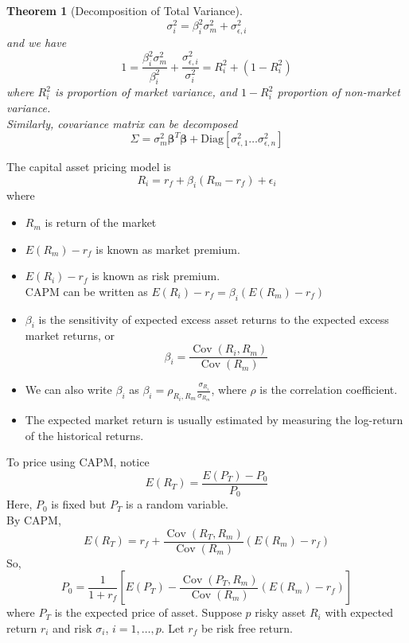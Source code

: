 \documentclass[11pt]{article}
\newtheorem{theorem}{Theorem}[section]
\theoremstyle{definition}
\DeclareMathOperator{\cov}{Cov}
\begin{document}
\begin{theorem}[Decomposition of Total Variance]
\[
\sigma_i^2 = \beta_i^2\sigma_m^2 + \sigma_{\epsilon, i}^2
\]
and we have
\[
1 = \frac{\beta_i^2\sigma_m^2}{\beta_i^2} + \frac{ \sigma_{\epsilon, i}^2}{\sigma_i^2} = R_i^2 + (1 - R_i^2)
\]
where $R_i^2$ is proportion of market variance, and $1-R_i^2$ proportion of non-market variance.\\
Similarly, covariance matrix can be decomposed
\[
\Sigma = \sigma_m^2\mathbf{\beta}^T\mathbf{\beta} + \text{Diag}[\sigma_{\epsilon, 1}^2 \ldots \sigma_{\epsilon, n}^2]
\]
\end{theorem}
The capital asset pricing model is 
\[
R_i = r_f + \beta_i(R_m - r_f) + \epsilon_i
\]
where 
\begin{itemize}
  \item $R_m$ is return of the market
  \item $E(R_m)-r_f$ is known as market premium.
  \item $E(R_i)-r_f$ is known as risk premium.\\
  CAPM can be written as $E(R_i)-r_f = \beta_i(E(R_m)-r_f)$
  \item $\beta_i$ is the sensitivity of expected excess asset returns to the expected excess market returns, or
  \[
\beta_i = \frac{\cov(R_i, R_m)}{\cov(R_m)}
  \]
  \item We can also write $\beta_i$ as $\beta_i = \rho_{R_i, R_m}\frac{\sigma_{R_i}}{\sigma_{R_m}}$, where $\rho$ is the correlation coefficient.
  \item The expected market return is usually estimated by measuring the log-return of the historical returns.
\end{itemize}
To price using CAPM, notice
\[
E(R_T) = \frac{E(P_T)-P_0}{P_0}
\]
Here, $P_0$ is fixed but $P_T$ is a random variable.\\
By CAPM,
\[
E(R_T) = r_f + \frac{\cov(R_T, R_m)}{\cov(R_m)}(E(R_m)-r_f)
\]
So,
\[
P_0 = \frac{1}{1+r_f}[E(P_T) - \frac{\cov(P_T, R_m)}{\cov(R_m)}(E(R_m)-r_f)]
\]
where $P_T$ is the expected price of asset.
Suppose $p$ risky asset $R_i$ with expected return $r_i$ and risk $\sigma_i$, $i = 1,\ldots, p$. Let $r_f$ be risk free return.\\
\end{document}
